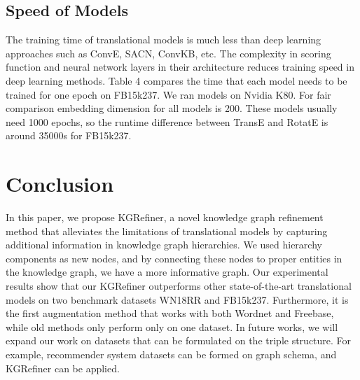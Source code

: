 \documentclass{article} \usepackage{iclr2022_conference,times}
\begin{document}
\subsection{Speed of Models}
The training time of translational models is much less than deep learning approaches such as ConvE, SACN, ConvKB, etc. The complexity in scoring function and neural network layers in their architecture reduces training speed in deep learning methods. Table 4 compares the time that each model needs to be trained for one epoch on FB15k237. We ran models on Nvidia K80. For fair comparison embedding dimension for all models is 200. These models usually need 1000 epochs, so the runtime difference between TransE and RotatE is around 35000s for FB15k237.




\section{Conclusion}
In this paper, we propose KGRefiner, a novel knowledge graph refinement method that alleviates the limitations of translational models by capturing additional information in knowledge graph hierarchies. We used hierarchy components as new nodes, and by connecting these nodes to proper entities in the knowledge graph, we have a more informative graph. Our experimental results show that our KGRefiner outperforms other state-of-the-art translational models on two benchmark datasets WN18RR and FB15k237. Furthermore, it is the first augmentation method that works with both Wordnet and Freebase, while old methods only perform only on one dataset.
\indent In future works, we will expand our work on datasets that can be formulated on the triple structure. For example, recommender system datasets can be formed on graph schema, and KGRefiner can be applied.
 



\end{document}
